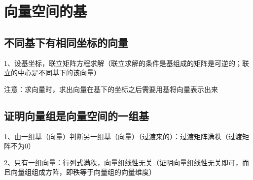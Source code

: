 \section{向量空间的基}



\subsection{不同基下有相同坐标的向量}

1、设基坐标，联立矩阵方程求解（联立求解的条件是基组成的矩阵是可逆的；联立的中心是不同基下的该向量）

注意：求向量时，求出向量在基下的坐标之后需要用基将向量表示出来



\subsection{证明向量组是向量空间的一组基}

1、由一组基（向量）判断另一组基（向量）（过渡来的）：过渡矩阵满秩（过渡矩阵不为0）

2、只有一组向量：行列式满秩，向量组线性无关（证明向量组线性无关即可，而且向量组组成方阵，即秩等于向量组的向量维度）

